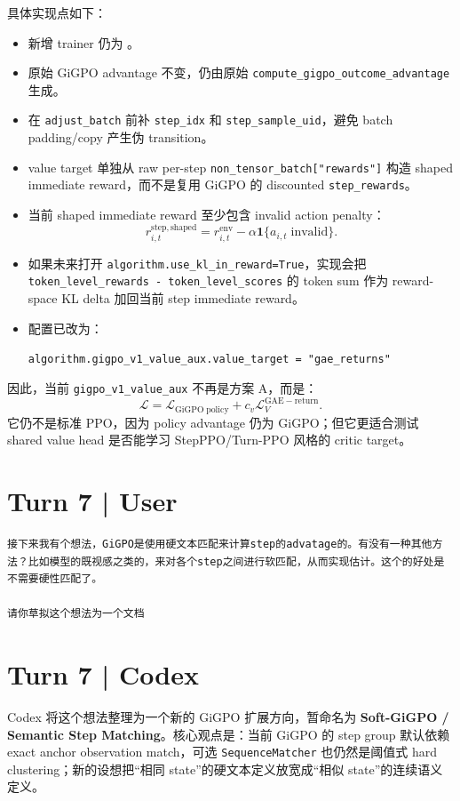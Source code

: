 \documentclass[10pt]{ctexart}
\newcommand{\code}[1]{\texttt{#1}}
\begin{document}
具体实现点如下：
\begin{itemize}
  \item 新增 trainer 仍为 。
  \item 原始 GiGPO advantage 不变，仍由原始 \code{compute\_gigpo\_outcome\_advantage} 生成。
  \item 在 \code{adjust\_batch} 前补 \code{step\_idx} 和 \code{step\_sample\_uid}，避免 batch padding/copy 产生伪 transition。
  \item value target 单独从 raw per-step \code{non\_tensor\_batch["rewards"]} 构造 shaped immediate reward，而不是复用 GiGPO 的 discounted \code{step\_rewards}。
  \item 当前 shaped immediate reward 至少包含 invalid action penalty：
  \[
  r_{i,t}^{\mathrm{step,shaped}}
  =r_{i,t}^{\mathrm{env}}-\alpha\mathbf{1}\{a_{i,t}\;\mathrm{invalid}\}.
  \]
  \item 如果未来打开 \code{algorithm.use\_kl\_in\_reward=True}，实现会把 \code{token\_level\_rewards - token\_level\_scores} 的 token sum 作为 reward-space KL delta 加回当前 step immediate reward。
  \item 配置已改为：
  \begin{center}
  \code{algorithm.gigpo\_v1\_value\_aux.value\_target = "gae\_returns"}
  \end{center}
\end{itemize}

因此，当前 \code{gigpo\_v1\_value\_aux} 不再是方案 A，而是：
\[
\mathcal{L}
=
\mathcal{L}_{\mathrm{GiGPO\;policy}}
+c_v\mathcal{L}_{V}^{\mathrm{GAE-return}}.
\]
它仍不是标准 PPO，因为 policy advantage 仍为 GiGPO；但它更适合测试 shared value head 是否能学习 StepPPO/Turn-PPO 风格的 critic target。


\section*{Turn 7 | User}
\begin{Verbatim}[breaklines=true,breakanywhere=true]
接下来我有个想法，GiGPO是使用硬文本匹配来计算step的advatage的。有没有一种其他方法？比如模型的既视感之类的，来对各个step之间进行软匹配，从而实现估计。这个的好处是不需要硬性匹配了。

请你草拟这个想法为一个文档
\end{Verbatim}

\section*{Turn 7 | Codex}
Codex 将这个想法整理为一个新的 GiGPO 扩展方向，暂命名为 \textbf{Soft-GiGPO / Semantic Step Matching}。核心观点是：当前 GiGPO 的 step group 默认依赖 exact anchor observation match，可选 \code{SequenceMatcher} 也仍然是阈值式 hard clustering；新的设想把“相同 state”的硬文本定义放宽成“相似 state”的连续语义定义。
\end{document}
